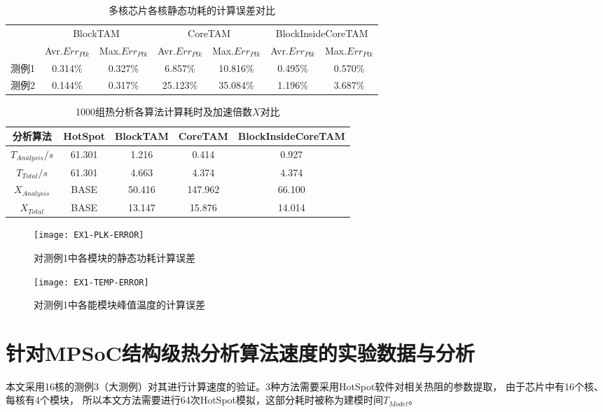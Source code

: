 \begin{table}
\centering
\caption{多核芯片各核静态功耗的计算误差对比}
\begin{tabular}{c c c c c c c}
\hline\hline
 & \multicolumn{2}{c}{BlockTAM} & \multicolumn{2}{c}{CoreTAM} & \multicolumn{2}{c}{BlockInsideCoreTAM} \\
 & Avr.$Err_{Plk}$ & Max.$Err_{Plk}$ & Avr.$Err_{Plk}$ & Max.$Err_{Plk}$ & Avr.$Err_{Plk}$ & Max.$Err_{Plk}$ \\
\hline
测例1 & 0.314\% & 0.327\% & 6.857\% & 10.816\% & 0.495\% & 0.570\% \\
\hline
测例2 & 0.144\% & 0.317\% & 25.123\% & 35.084\% & 1.196\% & 3.687\% \\
\hline
\end{tabular}
\label{tab:chap5:power-leakage-error}
\end{table}

\begin{table}
\centering
\caption{1000组热分析各算法计算耗时及加速倍数$X$对比}
\begin{tabular}{c c c c c}
\hline\hline
分析算法 & HotSpot & BlockTAM & CoreTAM & BlockInsideCoreTAM \\ [0.5ex]
\hline
$T_{Analysis}/s$ & 61.301 & 1.216 & 0.414 & 0.927 \\
\hline
$T_{Total}/s$ & 61.301 & 4.663 & 4.374 & 4.374 \\
\hline
$X_{Analysis}$ & BASE & 50.416 & 147.962 & 66.100 \\
\hline
$X_{Total}$ & BASE & 13.147 & 15.876 & 14.014 \\
\hline
\end{tabular}
\label{tab:chap5:time-speedup}
\end{table}

\begin{figure}[H]
  \centering
  \texttt{[image: EX1-PLK-ERROR]}
  \caption{对测例1中各模块的静态功耗计算误差}
  \label{fig:ex1-plk-error}
\end{figure}
\begin{figure}[H]
  \centering
  \texttt{[image: EX1-TEMP-ERROR]}
  \caption{对测例1中各能模块峰值温度的计算误差}
  \label{fig:ex1-temp-error}
\end{figure}


\section{针对MPSoC结构级热分析算法速度的实验数据与分析}
\label{exp-speedup}
本文采用16核的测例3（大测例）对其进行计算速度的验证。3种方法需要采用HotSpot软件对相关热阻的参数提取， 由于芯片中有16个核、每核有4个模块， 所以本文方法需要进行64次HotSpot模拟，这部分耗时被称为建模时间$T_{Model}$。

